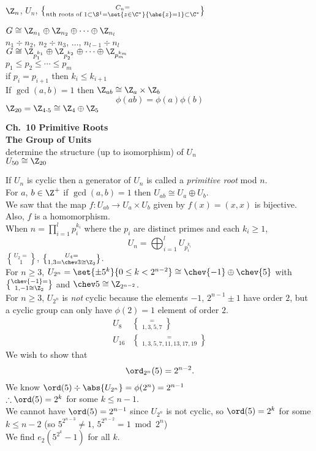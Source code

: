 $\Z_n$, $U_n$, $C_n=\brace{\text{$n$th roots of $1$}}\subset\S^1=\set{z\in\C^*}{\abs{z}=1}\subset\C^*$

$G\cong\Z_{n_1}\oplus\Z_{n_2}\oplus\dotsb\oplus\Z_{n_l}$ \\
$n_1\div n_2$, $n_2\div n_3$, $\dotsc$, $n_{l-1}\div n_l$ \\
$G\cong\Z_{p_1^{k_1}}\oplus\Z_{p_2^{k_2}}\oplus\dotsb\oplus\Z_{p_m^{k_m}}$ \\
$p_1\leq p_2\leq \dotsb \leq p_m$ \\
if $p_i=p_{i+1}$ then $k_i\leq k_{i+1}$ \\
If $\gcd(a,b)=1$ then $\Z_{ab}\cong\Z_a\times\Z_b$
\[ \phi(ab)=\phi(a)\phi(b) \]
$\Z_{20}=\Z_{4\cdot5}\cong\Z_4\oplus\Z_5$

\textbf{Ch.~10 Primitive Roots} \\
\textbf{The Group of Units} \\
\prob determine the structure (up to isomorphism) of $U_n$ \\
\eg $U_{50}\cong\Z_{20}$ %

 If $U_n$ is cyclic then a generator of $U_n$ is called a \emph{primitive root} mod $n$. \\
\thm For $a$, $b\in\Z^+$ if $\gcd(a,b)=1$ then $U_{ab}\cong U_a\oplus U_b$. \\
\pf We saw that the map $f\colon U_{ab}\to U_a\times U_b$ given by $f(x)=(x,x)$ is bijective.  Also, $f$ is a homomorphism. \\
\cor When $n=\prod_{i=1}^l p_i^{k_i}$ where the $p_i$ are distinct primes and each $k_i\geq1$,
\[ U_n = \bigoplus_{i=1}^l U_{p_i^{k_i}} \]
\thm $U_2=\brace1$, $U_4=\brace{1,3}=\chev3\cong\Z_2$. \\
For $n\geq3$, $U_{2^n}=\set{\pm5^k}{0\leq k<2^{n-2}}\cong\chev{-1}\oplus\chev{5}$ with $\chev{-1}=\brace{1,-1}\cong\Z_2$ and $\chev5\cong\Z_{2^{n-2}}$. \\
\pf For $n\geq3$, $U_{2^n}$ is \emph{not} cyclic because the elements $-1$, $2^{n-1}\pm1$ have order $2$, but a cyclic group can only have $\phi(2)=1$ element of order $2$.
\begin{align*}
U_8 &= \brace{1,3,5,7} \\
U_{16} &= \brace{1,3,5,7,11,13,17,19}
\end{align*}
We wish to show that
\[ \ord_{2^n}(5) = 2^{n-2} . \]
We know $\ord(5)\div\abs{U_{2^n}}=\phi(2^n)=2^{n-1}$ \\
$\therefore\ord(5)=2^k$ for some $k\leq n-1$. \\
We cannot have $\ord(5)=2^{n-1}$ since $U_{2^n}$ is not cyclic, so $\ord(5)=2^k$ for some $k\leq n-2$ (so $5^{2^{n-3}}\neq1$, $5^{2^{n-2}}=1\bmod2^n$) \\
We find $e_2(5^{2^k}-1)$ for all $k$.

